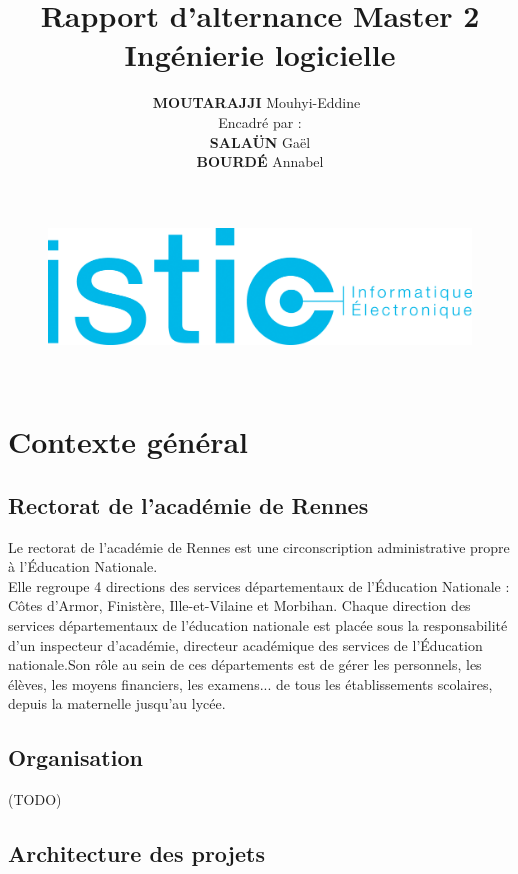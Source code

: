 \documentclass[a4paper]{article}
\title{\textbf{Rapport d'alternance Master 2 Ingénierie logicielle\\ }}
\author{\textbf{MOUTARAJJI} Mouhyi-Eddine\
\\Encadré par :\\\textbf{SALAÜN} Gaël \\\textbf{BOURDÉ} Annabel }
\begin{document}
\date{}

\begin{figure}
\centering
\includegraphics[width=1.1\textwidth]{diagrammes/logoisticfr_0.png}
\end{figure}


\maketitle

\newpage

\tableofcontents
~
\newpage



\section{Contexte général}
\subsection{Rectorat de l’académie de Rennes}

Le rectorat de l'académie de Rennes est une circonscription administrative propre à
l’Éducation Nationale.\\
Elle regroupe 4 directions des services départementaux de l'Éducation Nationale : 
Côtes d'Armor, Finistère, Ille-et-Vilaine et Morbihan. Chaque direction des services départementaux de l'éducation nationale est placée sous la responsabilité d'un inspecteur d'académie, directeur académique des services de l'Éducation nationale.Son rôle au sein de ces départements est de gérer les personnels, les élèves, les moyens financiers, les examens... de tous les établissements scolaires, depuis la maternelle jusqu'au lycée.

\subsection{Organisation}

(TODO)
\subsection{Architecture des projets}
\end{document}
